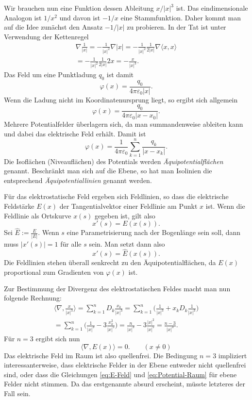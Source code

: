 \documentclass[a4paper,11pt,fleqn,twocolumn,twoside,dvipdfmx]{scrartcl}
\begin{document}
Wir brauchen nun eine Funktion dessen Ableitung
$x/|x|^3$ ist. Das eindimensionale Analogon
ist $1/x^2$ und davon ist $-1/x$ eine Stammfunktion.
Daher kommt man auf die Idee zunächst den Ansatz
$-1/|x|$ zu probieren. In der Tat ist
unter Verwendung der Kettenregel
\begin{gather*}
\nabla\frac{1}{|x|} = -\frac{1}{|x|^2}\nabla |x|
= -\frac{1}{|x|^2}\frac{1}{2|x|}\nabla\langle x,x\rangle\\
= -\frac{1}{|x|^2}\frac{1}{2|x|}2x
= -\frac{x}{|x|^3}.
\end{gather*}
Das Feld um eine Punktladung $q_0$ ist damit
\begin{equation}\label{eq:Potential-Raum}
\varphi(x) = \frac{q_0}{4\pi\varepsilon_0|x|}.
\end{equation}
Wenn die Ladung nicht im Koordinatenursprung liegt, so ergibt
sich allgemein
\[\varphi(x) = \frac{q_0}{4\pi\varepsilon_0|x-x_0|}.\]
Mehrere Potentialfelder überlagern sich, da man summandenweise
ableiten kann und dabei das elektrische Feld erhält.
Damit ist
\[\varphi(x) = \frac{1}{4\pi\varepsilon_0}
\sum_{k=1}^n \frac{q_k}{|x-x_k|}.\]
Die Isoflächen (Niveauflächen)
des Potentials werden \emph{Äquipotentialflächen} genannt.
Beschränkt man sich auf die Ebene, so hat man Isolinien die
entsprechend \emph{Äquipotentiallinien} genannt werden.

Für das elektrostatische Feld ergeben sich Feldlinien, so dass
die elektrische Feldstärke $E(x)$ der Tangentialvektor
einer Feldlinie am Punkt $x$ ist. Wenn die Feldlinie als
Ortskurve $x(s)$ gegeben ist, gilt also
\[x'(s)=E(x(s)).\]
Sei $\hat E:=\frac{E}{|E|}$. Wenn $s$ eine Parametrisierung nach
der Bogenlänge sein soll, dann muss $|x'(s)|=1$ für alle $s$ sein.
Man setzt dann also
\[x'(s)=\hat E(x(s)).\]
Die Feldlinien stehen überall senkrecht zu den Äquipotentialflächen,
da $E(x)$ proportional zum Gradienten von $\varphi(x)$ ist.

Zur Bestimmung der Divergenz des elektrostatischen Feldes macht man
nun folgende Rechnung:
\begin{gather*}
\langle\nabla,\frac{x}{|x|^3}\rangle
= \sum_{k=1}^n D_k\frac{x_k}{|x|^3}
= \sum_{k=1}^n \bigg(\frac{1}{|x|^3}+x_kD_k\frac{1}{|x|^3}\bigg)\\
= \sum_{k=1}^n \bigg(\frac{1}{|x|^3}-3\frac{x_k^2}{|x|^5}\bigg)
= \frac{n}{|x|^3}-3\frac{|x|^2}{|x|^5}
= \frac{n-3}{|x|^3}.
\end{gather*}
Für $n=3$ ergibt sich nun
\begin{equation}\label{eq:quellenfrei}
\langle\nabla,E(x)\rangle = 0.\qquad (x\ne 0)
\end{equation}
Das elektrische Feld im Raum ist also quellenfrei.
Die Bedingung $n=3$ impliziert interessanterweise, dass elektrische
Felder in der Ebene entweder nicht quellenfrei sind, oder dass
die Gleichungen \eqref{eq:E-Feld} und \eqref{eq:Potential-Raum} für
ebene Felder nicht stimmen. Da das erstgenannte absurd erscheint,
müsste letzteres der Fall sein.
\end{document}
